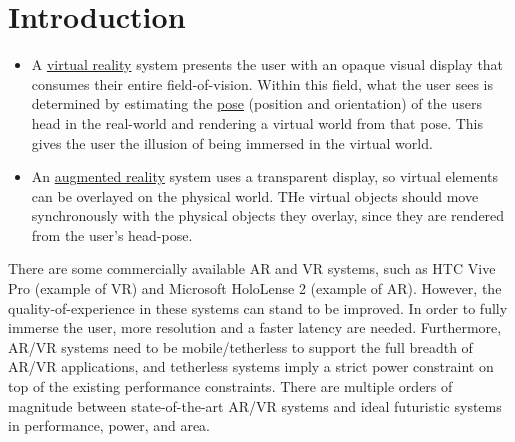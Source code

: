\section{Introduction}

\begin{itemize}
\item A \underline{virtual reality} system presents the user with an opaque visual display that consumes their entire {field-of-vision}. Within this field, what the user sees is determined by estimating the \underline{pose} (position and orientation) of the users head in the real-world and {rendering} a virtual world from that pose. This gives the user the illusion of being immersed in the virtual world.

\item An \underline{augmented reality} system uses a transparent display, so virtual elements can be overlayed on the physical world. THe virtual objects should move synchronously with the physical objects they overlay, since they are rendered from the user's head-pose.



\end{itemize}

There are some commercially available AR and VR systems, such as HTC Vive Pro (example of VR) and Microsoft HoloLense 2 (example of AR). However, the {quality-of-experience} in these systems can stand to be improved. In order to fully immerse the user, more resolution and a faster latency are needed. Furthermore, AR/VR systems need to be mobile/tetherless to support the full breadth of AR/VR applications, and tetherless systems imply a strict power constraint on top of the existing performance constraints. There are multiple orders of magnitude between state-of-the-art AR/VR systems and ideal futuristic systems in performance, power, and area.

